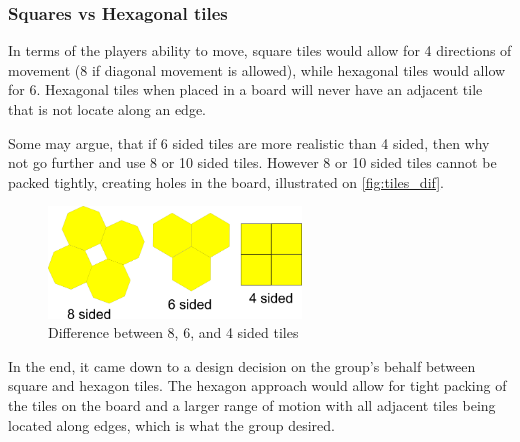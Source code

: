 \subsubsection{Squares vs Hexagonal tiles}
In terms of the players ability to move, square tiles would allow for 4 directions of movement (8 if diagonal movement is allowed), while hexagonal tiles would allow for 6.
Hexagonal tiles when placed in a board will never have an adjacent tile that is not locate along an edge.\newline

Some may argue, that if 6 sided tiles are more realistic than 4 sided, then why not go further and use 8 or 10 sided tiles.
However 8 or 10 sided tiles cannot be packed tightly, creating holes in the board, illustrated on \autoref{fig:tiles_dif}.

\begin{figure}[h]
  \centering
    \includegraphics[width=0.6\textwidth]{img/8-6-4-sided-tiles.png}
  \caption{Difference between 8, 6, and 4 sided tiles}
  \label{fig:tiles_dif}
\end{figure}

In the end, it came down to a design decision on the group's behalf between square and hexagon tiles.
The hexagon approach would allow for tight packing of the tiles on the board and a larger range of motion with all adjacent tiles being located along edges, which is what the group desired.



